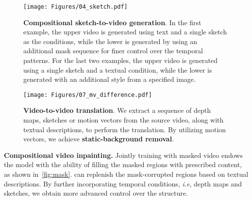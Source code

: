 \begin{figure}[t]
    \centering
\texttt{[image: Figures/04\_sketch.pdf]}
     \vspace{-1.5em}
    \caption{
    \small
    \textbf{Compositional sketch-to-video generation}.
    In the first example, the upper video is generated using text and a single sketch as the conditions, while the lower is generated by using an additional mask sequence for finer control over the temporal patterns.
    For the last two examples, the upper video is generated using a single sketch and a textual condition, while the lower is generated with an additional style from a specified image.
    }
    \label{fig:single_sketch}
    \vspace{-3mm}
\end{figure}

\begin{figure}[t]
    \centering
    \texttt{[image: Figures/07\_mv\_difference.pdf]}
     \vspace{-1em}
    \caption{
    \small
    \textbf{Video-to-video translation}.
    We extract a sequence of depth maps, sketches or motion vectors from the source video, along with textual descriptions, to perform the translation.
    By utilizing motion vectors, we achieve \textbf{static-background removal}.
    }
    \label{fig:motion_prioritization}
    \vspace{-5mm}
\end{figure}

\textbf{Compositional video inpainting.}
Jointly training with masked video endows the model with the ability of filling the masked regions with prescribed content, as shown in~\cref{fig:mask}.
\method can replenish the mask-corrupted regions based on textual descriptions.
By further incorporating temporal conditions, \emph{i.e}, depth maps and sketches, we obtain more advanced control over the structure.

